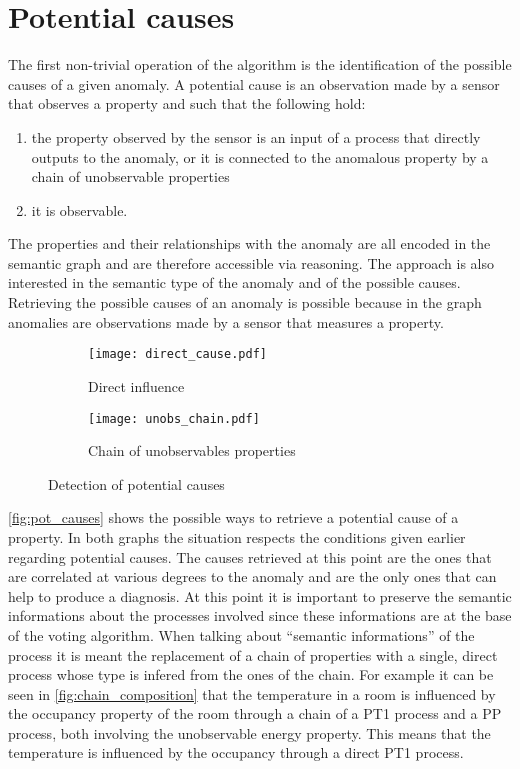 \section{Potential causes}\label{sec:potential_causes}
The first non-trivial operation of the algorithm is the identification of the possible causes of a given anomaly. A potential cause is an observation made by a sensor that observes a property and such that the following hold:
\begin{enumerate}
  \item the property observed by the sensor is an input of a process that directly outputs to the anomaly, or it is connected to the anomalous property by a chain of unobservable properties
  \item it is observable.
\end{enumerate}
The properties and their relationships with the anomaly are all encoded in the semantic graph and are therefore accessible via reasoning. The approach is also interested in the semantic type of the anomaly and of the possible causes.
Retrieving the possible causes of an anomaly is possible because in the graph anomalies are observations made by a sensor that measures a property.
\begin{figure}
  \begin{subfigure}[b]{\textwidth}
    \centering
      \texttt{[image: direct\_cause.pdf]}
      \caption{Direct influence}
      \label{fig:direct_influence}
  \end{subfigure}
  \bigskip
  \begin{subfigure}[b]{\textwidth}
    \centering
      \texttt{[image: unobs\_chain.pdf]}
      \caption{Chain of unobservables properties}
      \label{fig:chain_unobs}
  \end{subfigure}
  \caption{Detection of potential causes}
  \label{fig:pot_causes}
\end{figure}
\autoref{fig:pot_causes} shows the possible ways to retrieve a potential cause of a property. In both graphs the situation respects the conditions given earlier regarding potential causes.
The causes retrieved at this point are the ones that are correlated at various degrees to the anomaly and are the only ones that can help to produce a diagnosis. At this point it is important to preserve the semantic informations %
about the processes involved since these informations are at the base of the voting algorithm. When talking about ``semantic informations'' of the process it is meant the replacement of a chain of properties with a single, direct process whose type is infered from the ones of the chain. For example it can be seen in \autoref{fig:chain_composition} that the temperature in a room is influenced by the occupancy property of the room through a chain of a PT1 process and a PP process, both involving the unobservable energy property. This means that the temperature is influenced by the occupancy through a direct PT1 process.
